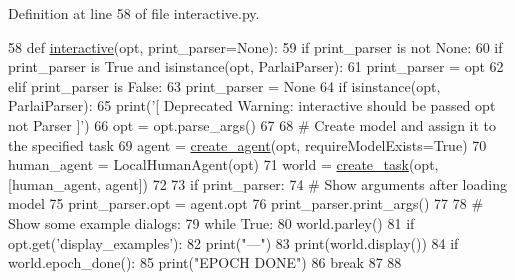 Definition at line 58 of file interactive.\+py.


\begin{DoxyCode}
58 \textcolor{keyword}{def }\hyperlink{namespaceprojects_1_1self__feeding_1_1interactive_aaebd4c577ab0371c73e8442be469ebab}{interactive}(opt, print\_parser=None):
59     \textcolor{keywordflow}{if} print\_parser \textcolor{keywordflow}{is} \textcolor{keywordflow}{not} \textcolor{keywordtype}{None}:
60         \textcolor{keywordflow}{if} print\_parser \textcolor{keywordflow}{is} \textcolor{keyword}{True} \textcolor{keywordflow}{and} isinstance(opt, ParlaiParser):
61             print\_parser = opt
62         \textcolor{keywordflow}{elif} print\_parser \textcolor{keywordflow}{is} \textcolor{keyword}{False}:
63             print\_parser = \textcolor{keywordtype}{None}
64     \textcolor{keywordflow}{if} isinstance(opt, ParlaiParser):
65         print(\textcolor{stringliteral}{'[ Deprecated Warning: interactive should be passed opt not Parser ]'})
66         opt = opt.parse\_args()
67 
68     \textcolor{comment}{# Create model and assign it to the specified task}
69     agent = \hyperlink{namespaceparlai_1_1core_1_1agents_ad0d54074d4bcc148bb415ab5515a53b5}{create\_agent}(opt, requireModelExists=\textcolor{keyword}{True})
70     human\_agent = LocalHumanAgent(opt)
71     world = \hyperlink{namespaceparlai_1_1core_1_1worlds_a11923c10b545c7ecc1b08fe2242d9c2c}{create\_task}(opt, [human\_agent, agent])
72 
73     \textcolor{keywordflow}{if} print\_parser:
74         \textcolor{comment}{# Show arguments after loading model}
75         print\_parser.opt = agent.opt
76         print\_parser.print\_args()
77 
78     \textcolor{comment}{# Show some example dialogs:}
79     \textcolor{keywordflow}{while} \textcolor{keyword}{True}:
80         world.parley()
81         \textcolor{keywordflow}{if} opt.get(\textcolor{stringliteral}{'display\_examples'}):
82             print(\textcolor{stringliteral}{"---"})
83             print(world.display())
84         \textcolor{keywordflow}{if} world.epoch\_done():
85             print(\textcolor{stringliteral}{"EPOCH DONE"})
86             \textcolor{keywordflow}{break}
87 
88 
\end{DoxyCode}
\mbox{\label{namespaceparlai_1_1scripts_1_1interactive_a873c4ae402aee061884a22139a5a442f}} 
